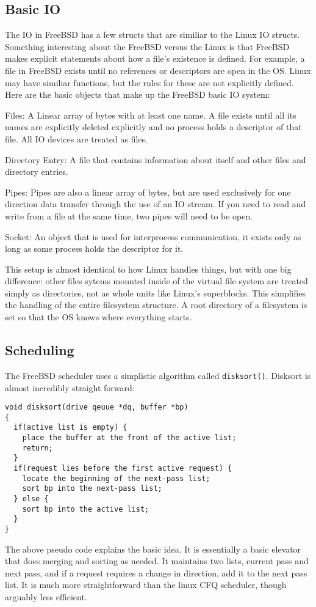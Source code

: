 \documentclass[10pt,letterpaper,onecolumn,draftclsnofoot]{IEEEtran}
\begin{document}
 \subsection{Basic IO}
 The IO in FreeBSD has a few structs that are similiar to the Linux IO structs.
 Something interesting about the FreeBSD versus the Linux is that FreeBSD
 makes explicit statements about how a file's existence is defined. For example,
 a file in FreeBSD exists until no references or descriptors are open in the OS.
 Linux may have similiar functions, but the rules for these are not explicitly
 defined. Here are the basic objects that make up the FreeBSD basic IO system:
 \cite{freebsd2016}
 \begin{description}
   \item Files: A Linear array of bytes with at least one name. A file exists
   until all its names are explicitly deleted explicitly and no process holds a
   descriptor of that file. All IO devices are treated as files.
   \item Directory Entry: A file that contains information about itself and
   other files and directory entries.
   \item Pipes: Pipes are also a linear array of bytes, but are used exclusively
   for one direction data transfer through the use of an IO stream. If you need
   to read and write from a file at the same time, two pipes will need to be open.
   \item Socket: An object that is used for interprocess communication, it exists
   only as long as some process holds the descriptor for it.
 \end{description}

 This setup is almost identical to how Linux handles things, but with one big
 difference: other files sytems mounted inside of the virtual file system are treated simply
 as directories, not as whole units like Linux's superblocks. This simplifies
 the handling of the entire filesystem structure. A root directory of a filesystem
 is set so that the OS knows where everything starts.

 \subsection{Scheduling}
 The FreeBSD scheduler uses a simplistic algorithm called \texttt{disksort()}.
 Disksort is almost incredibly straight forward: \cite{kirkgeorgebsd}
 \begin{lstlisting}
void disksort(drive qeuue *dq, buffer *bp)
{
  if(active list is empty) {
    place the buffer at the front of the active list;
    return;
  }
  if(request lies before the first active request) {
    locate the beginning of the next-pass list;
    sort bp into the next-pass list;
  } else {
    sort bp into the active list;
  }
}
 \end{lstlisting}
 The above pseudo code explains the basic idea. It is essentially a basic elevator
 that does merging and sorting as needed. It maintains two lists, current pass
 and next pass, and if a request requires a change in direction, add it to the
 next pass list. It is much more straightforward than the linux CFQ scheduler, though
 arguably less efficient. \cite{freebsd2016}
\end{document}
